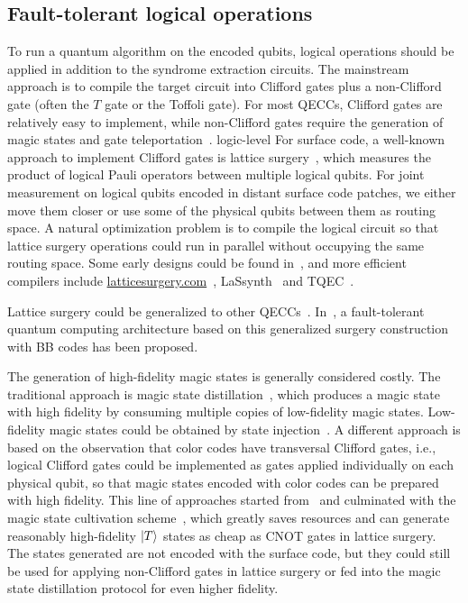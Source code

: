 \documentclass[a4paper,onecolumn,11pt,unpublished]{quantumarticle}
\begin{document}
\subsection{Fault-tolerant logical operations}
To run a quantum algorithm on the encoded qubits, logical operations should be applied in addition to the syndrome extraction circuits. The mainstream approach is to compile the target circuit into Clifford gates plus a non-Clifford gate (often the $T$ gate or the Toffoli gate). For most QECCs, Clifford gates are relatively easy to implement, while non-Clifford gates require the generation of magic states and gate teleportation~\cite{bravyi2005universal}. 
logic-level
For surface code, a well-known approach to implement Clifford gates is lattice surgery~\cite{Horsman_2012,Litinski2018latticesurgery,fowler2019lowoverheadquantumcomputation,Litinski2019gameofsurfacecodes}, which measures the product of logical Pauli operators between multiple logical qubits. For joint measurement on logical qubits encoded in distant surface code patches, we either move them closer or use some of the physical qubits between them as routing space. A natural optimization problem is to compile the logical circuit so that lattice surgery operations could run in parallel without occupying the same routing space. Some early designs could be found in~\cite{Litinski2019gameofsurfacecodes}, and more efficient compilers include \url{latticesurgery.com}~\cite{Watkins2024highperformance}, LaSsynth~\cite{tan2024satscalpel} and TQEC~\cite{TQEC}.

Lattice surgery could be generalized to other QECCs~\cite{cross2024improvedqldpcsurgerylogical,swaroop2025universaladaptersquantumldpc,zhang2025time}. In~\cite{yoder2025tourgrossmodularquantum}, a fault-tolerant quantum computing architecture based on this generalized surgery construction with BB codes has been proposed.

The generation of high-fidelity magic states is generally considered costly. The traditional approach is magic state distillation~\cite{bravyi2005universal, Gidney2019efficientmagicstate, Litinski2019magicstate, Heussen2025efficientfault}, which produces a magic state with high fidelity by consuming multiple copies of low-fidelity magic states. Low-fidelity magic states could be obtained by state injection~\cite{landahl2014quantumcomputingcolorcodelattice, Li2015magicstate}. A different approach is based on the observation that color codes have transversal Clifford gates, i.e., logical Clifford gates could be implemented as gates applied individually on each physical qubit, so that magic states encoded with color codes can be prepared with high fidelity. This line of approaches started from~\cite{chamberland2020very, itogawa2025efficient} and culminated with the magic state cultivation scheme~\cite{gidney2024magicstatecultivationgrowing}, which greatly saves resources and can generate reasonably high-fidelity $\ket{T}$ states as cheap as CNOT gates in lattice surgery. The states generated are not encoded with the surface code, but they could still be used for applying non-Clifford gates in lattice surgery or fed into the magic state distillation protocol for even higher fidelity.
\end{document}
